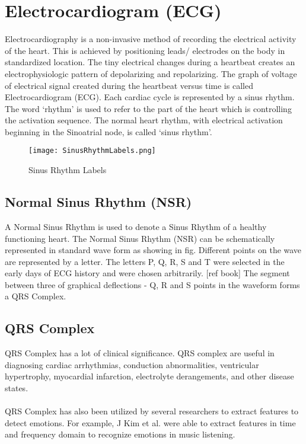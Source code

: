 \section{Electrocardiogram (ECG)}
Electrocardiography is a non-invasive method of recording the electrical activity of the heart. This is achieved by positioning leads/ electrodes on the body in standardized location. The tiny electrical changes during a heartbeat creates an electrophysiologic pattern of depolarizing and repolarizing.
The graph of voltage of electrical signal created during the heartbeat versus time is called Electrocardiogram (ECG). Each cardiac cycle is represented by a sinus rhythm. The word ‘rhythm’ is used to refer to the part of the heart which is controlling the activation sequence. The normal heart rhythm, with electrical activation beginning in the Sinoatrial node, is called ‘sinus rhythm’.\cite{hampton_ecg_2013}

\begin{figure}
	\centering
	\texttt{[image: SinusRhythmLabels.png]}
	\caption{Sinus Rhythm Labels}
	\label{fig:sinus_rhythm_labels}
\end{figure}

\subsection{Normal Sinus Rhythm (NSR)}
A Normal Sinus Rhythm is used to denote a Sinus Rhythm of a healthy functioning heart. The Normal Sinus Rhythm (NSR) can be schematically represented in standard wave form as showing in fig. Different points on the wave are represented by a letter. The letters P, Q, R, S and T were selected in the early days of ECG history and were chosen arbitrarily. [ref book] The segment between three of graphical deflections - Q, R and S points in the waveform forms a QRS Complex.

\subsection{QRS Complex}
QRS Complex has a lot of clinical significance. QRS complex are useful in diagnosing cardiac arrhythmias, conduction abnormalities, ventricular hypertrophy, myocardial infarction, electrolyte derangements, and other disease states.\cite{noauthor_qrs_2018}
\paragraph{}
QRS Complex has also been utilized by several researchers to extract features to detect emotions. For example, J Kim et al. were able to extract features in time and frequency domain to recognize emotions in music listening.\cite{kim_emotion_2004}

